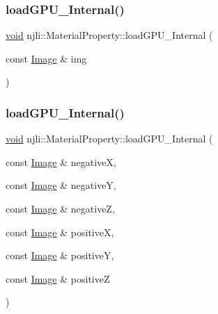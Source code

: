 \subsubsection{\texorpdfstring{load\+G\+P\+U\+\_\+\+Internal()}{loadGPU\_Internal()}\hspace{0.1cm}{\footnotesize\ttfamily [2/4]}}
{\footnotesize\ttfamily \mbox{\hyperlink{_thread_8h_af1e856da2e658414cb2456cb6f7ebc66}{void}} njli\+::\+Material\+Property\+::load\+G\+P\+U\+\_\+\+Internal (\begin{DoxyParamCaption}\item[{const \mbox{\hyperlink{classnjli_1_1_image}{Image}} \&}]{img }\end{DoxyParamCaption})\hspace{0.3cm}{\ttfamily [private]}}

\mbox{\label{classnjli_1_1_material_property_aa9a78f32c94e7d5e822dd328eb954ec9}} 
\subsubsection{\texorpdfstring{load\+G\+P\+U\+\_\+\+Internal()}{loadGPU\_Internal()}\hspace{0.1cm}{\footnotesize\ttfamily [3/4]}}
{\footnotesize\ttfamily \mbox{\hyperlink{_thread_8h_af1e856da2e658414cb2456cb6f7ebc66}{void}} njli\+::\+Material\+Property\+::load\+G\+P\+U\+\_\+\+Internal (\begin{DoxyParamCaption}\item[{const \mbox{\hyperlink{classnjli_1_1_image}{Image}} \&}]{negativeX,  }\item[{const \mbox{\hyperlink{classnjli_1_1_image}{Image}} \&}]{negativeY,  }\item[{const \mbox{\hyperlink{classnjli_1_1_image}{Image}} \&}]{negativeZ,  }\item[{const \mbox{\hyperlink{classnjli_1_1_image}{Image}} \&}]{positiveX,  }\item[{const \mbox{\hyperlink{classnjli_1_1_image}{Image}} \&}]{positiveY,  }\item[{const \mbox{\hyperlink{classnjli_1_1_image}{Image}} \&}]{positiveZ }\end{DoxyParamCaption})\hspace{0.3cm}{\ttfamily [private]}}

